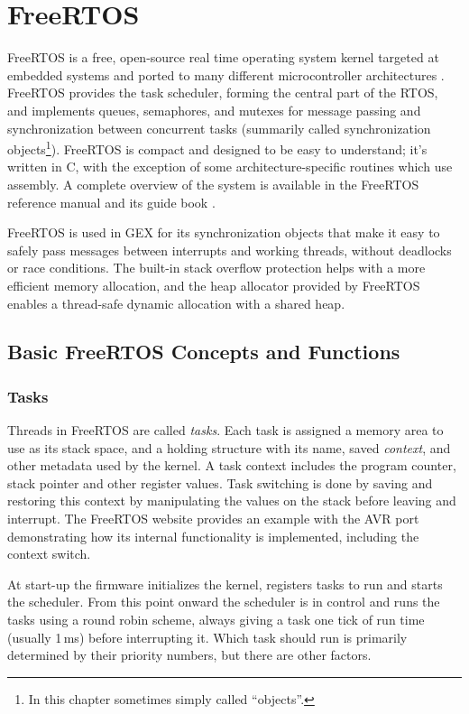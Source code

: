 \chapter{FreeRTOS}

FreeRTOS is a free, open-source real time operating system kernel targeted at embedded systems and ported to many different microcontroller architectures \cite{freertos-ports-list}. FreeRTOS provides the task scheduler, forming the central part of the RTOS, and implements queues, semaphores, and mutexes for message passing and synchronization between concurrent tasks (summarily called synchronization objects\footnote{In this chapter sometimes simply called ``objects''.}). FreeRTOS is compact and designed to be easy to understand; it's written in C, with the exception of some architecture-specific routines which use assembly. A complete overview of the system is available in the FreeRTOS reference manual \cite{freertos-rm} and its guide book \cite{freertos-book}.

FreeRTOS is used in GEX for its synchronization objects that make it easy to safely pass messages between interrupts and working threads, without deadlocks or race conditions. The built-in stack overflow protection helps with a more efficient memory allocation, and the heap allocator provided by FreeRTOS enables a thread-safe dynamic allocation with a shared heap.

\section{Basic FreeRTOS Concepts and Functions}

\subsection{Tasks}

Threads in FreeRTOS are called \textit{tasks}. Each task is assigned a memory area to use as its stack space, and a holding structure with its name, saved \textit{context}, and other metadata used by the kernel. A task context includes the program counter, stack pointer and other register values. Task switching is done by saving and restoring this context by manipulating the values on the stack before leaving and interrupt. The FreeRTOS website provides an example with the AVR port \cite{freertos-task-switching} demonstrating how its internal functionality is implemented, including the context switch.

At start-up the firmware initializes the kernel, registers tasks to run and starts the scheduler. From this point onward the scheduler is in control and runs the tasks using a round robin scheme, always giving a task one tick of run time (usually 1\,ms) before interrupting it. Which task should run is primarily determined by their priority numbers, but there are other factors.

